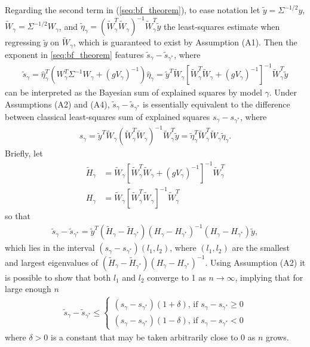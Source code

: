 Regarding the second term in (\ref{seq:bf_theorem}), to ease notation let $\tilde{y}= \Sigma^{-1/2} y$, $\widetilde{W}_\gamma= \Sigma^{-1/2} W_\gamma$,
and $\tilde{\eta}_\gamma= (\widetilde{W}_\gamma^T \widetilde{W}_\gamma)^{-1} \widetilde{W}_\gamma^T \tilde{y}$ the least-squares estimate when regressing $\tilde{y}$ on $\widetilde{W}_\gamma$, which is guaranteed to exist by Assumption (A1).
Then the exponent in \eqref{seq:bf_theorem} features $\tilde{s}_\gamma - \tilde{s}_{\gamma^*}$, where
\begin{align}
\tilde{s}_\gamma= \hat{\eta}_\gamma^T (W_\gamma^T \Sigma^{-1} W_\gamma + (g V_\gamma)^{-1}) \hat{\eta}_\gamma=
\tilde{y}^T \widetilde{W}_\gamma [\widetilde{W}_\gamma^T \widetilde{W}_\gamma + (g V_\gamma)^{-1}]^{-1} \widetilde{W}_\gamma^T \tilde{y}
\label{seq:bayesian_sse}
\end{align}
can be interpreted as the Bayesian sum of explained squares by model $\gamma$.
Under Assumptions (A2) and (A4), $\tilde{s}_\gamma - \tilde{s}_{\gamma^*}$ is essentially equivalent to the difference between classical least-squares sum of explained squares $s_\gamma - s_{\gamma^*}$, where
\begin{align}
 s_\gamma= \tilde{y}^T \widetilde{W}_\gamma (\widetilde{W}_\gamma^T \widetilde{W}_\gamma)^{-1} \widetilde{W}_\gamma^T \tilde{y}=
\tilde{\eta}_\gamma^T \widetilde{W}_\gamma^T \widetilde{W}_\gamma \tilde{\eta}_\gamma.
\nonumber
\end{align}
Briefly, let
\begin{align}
\tilde{H}_\gamma&= \widetilde{W}_\gamma [\widetilde{W}_\gamma^T \widetilde{W}_\gamma + (g V_\gamma)^{-1}]^{-1} \widetilde{W}_\gamma^T
\nonumber \\
H_\gamma&= \widetilde{W}_\gamma [\widetilde{W}_\gamma^T \widetilde{W}_\gamma]^{-1} \widetilde{W}_\gamma^T
\nonumber
\end{align}
so that
\begin{align}
 \tilde{s}_\gamma - \tilde{s}_{\gamma^*}=
\tilde{y}^T( \tilde{H}_\gamma - \tilde{H}_{\gamma^*}) (H_\gamma - H_{\gamma^*})^{-1} (H_\gamma - H_{\gamma^*}) \tilde{y},
\nonumber
\end{align}
which lies in the interval $(s_\gamma - s_{\gamma^*}) (l_1, l_2)$,
where $(l_1,l_2)$ are the smallest and largest eigenvalues of $( \tilde{H}_\gamma - \tilde{H}_{\gamma^*}) (H_\gamma - H_{\gamma^*})^{-1}$.
Using Assumption (A2) it is possible to show that both $l_1$ and $l_2$ converge to 1 as $n \rightarrow \infty$, implying that for large enough $n$
\begin{align}
\tilde{s}_\gamma - \tilde{s}_{\gamma^*} \leq
\begin{cases}
 (s_\gamma - s_{\gamma^*}) (1 + \delta) \mbox{, if } s_\gamma - s_{\gamma^*} \geq 0 \\
 (s_\gamma - s_{\gamma^*}) (1 - \delta) \mbox{, if } s_\gamma - s_{\gamma^*} < 0
\end{cases}
\label{eq:ineq_bayesssdif}
\end{align}
where $\delta>0$ is a constant that may be taken arbitrarily close to 0 as $n$ grows.


